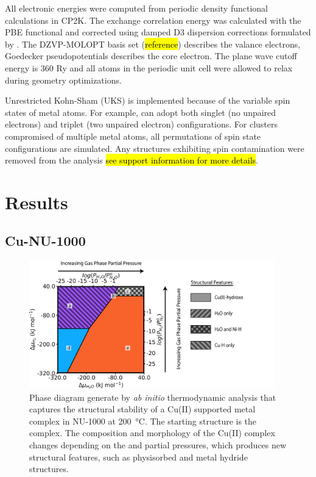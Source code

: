 \documentclass[journal=jctcce,manuscript=article]{achemso}
\begin{document}
All electronic energies were computed from periodic density functional calculations in CP2K.\cite{Hutter2014} The exchange correlation energy was calculated with the PBE functional\cite{Perdew1996} and corrected using damped D3 dispersion corrections formulated by \citeauthor{Grimme2010}.\cite{Grimme2010} The DZVP-MOLOPT basis set (\hl{reference}) describes the valance electrons, Goedecker pseudopotentials\cite{Goedecker1996} describes the core electron. The plane wave cutoff energy is 360 Ry and  all atoms in the periodic unit cell were allowed to relax during geometry optimizations.

Unrestricted Kohn-Sham (UKS) is implemented because of the variable spin states of metal atoms. For example,  can adopt both singlet (no unpaired electrons) and triplet (two unpaired electron) configurations. For clusters compromised of multiple metal atoms, all permutations of spin state configurations are simulated. Any structures exhibiting spin contamination were removed from the analysis \hl{see support information for more details}.   


\newpage
\section{Results}
\subsection{Cu-NU-1000}

\begin{figure}[H]
    \centering
    \includegraphics[width=0.95\textwidth]{zi-images/02-Cu-Graphics/2020-08-05-Cu3-phase-diagram-V01.png}
    \caption{Phase diagram generate by \textit{ab initio} thermodynamic analysis that captures the structural stability of a Cu(II) supported metal complex in NU-1000 at \SI{200}{\celsius}. The starting structure is the  complex. The composition and morphology of the Cu(II) complex changes depending on the  and  partial pressures, which produces new structural features, such as physisorbed  and metal hydride structures.}
    \label{fig:phasediagramCu3}
\end{figure}
\end{document}

